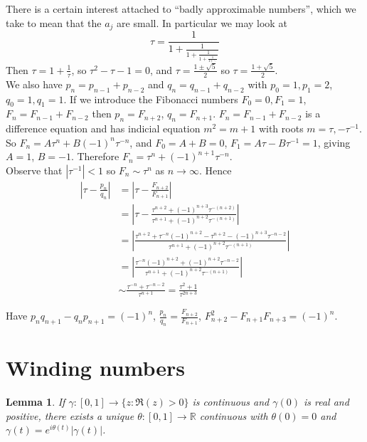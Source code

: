 \documentclass[a4paper, 10pt, twocolumn]{amsart}
\newtheorem*{lemma}{Lemma}
\theoremstyle{definition}
\newcommand{\bb}[1]{\mathbb{#1}}
\newcommand{\1}{\mathbbm{1}}
\begin{document}
There is a certain interest attached to ``badly approximable numbers'', which we take to mean that the $a_j$ are small. In particular we may look at \[\tau = \frac{1}{1+\frac{1}{1+\frac{1}{1+\frac{1}{1+\ddots}}}}\]
Then $\tau = 1+\frac{1}{\tau}$, so $\tau^2-\tau-1=0$, and $\tau = \frac{1\pm \sqrt{5}}{2}$ so $\tau = \frac{1+\sqrt{5}}{2}$.\\

We also have $p_n = p_{n-1}+p_{n-2}$ and $q_n = q_{n-1} + q_{n-2}$ with $p_0 = 1,p_1 = 2$, $q_0 = 1,q_1=1$. If we introduce the Fibonacci numbers $F_0=0,F_1=1$, $F_n = F_{n-1}+F_{n-2}$ then $p_n = F_{n+2}$, $q_n = F_{n+1}$. $F_n = F_{n-1}+F_{n-2}$ is a difference equation and has indicial equation $m^2=m+1$ with roots $m = \tau, -\tau^{-1}$. So $F_n = A\tau^n + B(-1)^n \tau^{-n}$, and $F_0 = A+B = 0$, $F_1 = A\tau-B\tau^{-1} = 1$, giving $A= 1$, $B=-1$. Therefore $F_n=\tau^n+(-1)^{n+1} \tau^{-n}$.\\

Observe that $|\tau^{-1}|<1$ so $F_n \sim \tau^n$ as $n \to \infty$. Hence \begin{align*}
    \left|\tau-\frac{p_n}{q_n}\right| &= \left|\tau - \frac{F_{n+2}}{F_{n+1}}\right|\\
    &=\left|\tau-\frac{\tau^{n+2}+(-1)^{n+3}\tau^{-(n+2)}}{\tau^{n+1}+(-1)^{n+2}\tau^{-(n+1)}}\right|\\
    &=\left|\frac{\tau^{n+2}+\tau^{-n}(-1)^{n+2}-\tau^{n+2}-(-1)^{n+3}\tau^{-n-2}}{\tau^{n+1}+(-1)^{n+2}\tau^{-(n+1)}}\right|\\
    &=\left|\frac{\tau^{-n}(-1)^{n+2}+(-1)^{n+2} \tau^{-n-2}}{\tau^{n+1}+(-1)^{n+2}\tau^{-(n+1)}}\right|\\
    &\sim \frac{\tau^{-n}+\tau^{-n-2}}{\tau^{n+1}} = \frac{\tau^2+1}{\tau^{2n+3}}
\end{align*}

Have $p_nq_{n+1}-q_np_{n+1} = (-1)^n$, $\frac{p_n}{q_n} = \frac{F_{n+2}}{F_{n+1}}$, $F_{n+2}^2-F_{n+1}F_{n+3} = (-1)^n$.





\section{Winding numbers}

\begin{lemma}
    If $\gamma:[0,1] \to \{z: \Re(z)>0\}$ is continuous and $\gamma(0)$ is real and positive, there exists a unique $\theta:[0,1] \to \bb{R}$ continuous with $\theta(0) = 0$ and $\gamma(t) = e^{i\theta(t)}|\gamma(t)|$.  
\end{lemma}
\end{document}
